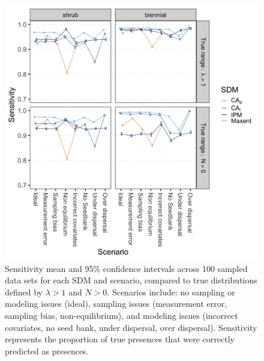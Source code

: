 \documentclass[]{article}
\begin{document}
\newpage
\begin{figure}
    \centering\includegraphics[width=.75\linewidth]{../../figs/Supp_Sens_mn+CI.jpg}
    \caption{\label{fig:SensitivityMed} Sensitivity mean and 95\% confidence intervals across 100 sampled data sets for each SDM and scenario, compared to true distributions defined by $\lambda > 1$ and $N > 0$. Scenarios include: no sampling or modeling issues (ideal), sampling issues (measurement error, sampling bias, non-equilibrium), and modeling issues (incorrect covariates, no seed bank, under dispersal, over dispersal). Sensitivity represents the proportion of true presences that were correctly predicted as presences.}
\end{figure}
\end{document}
